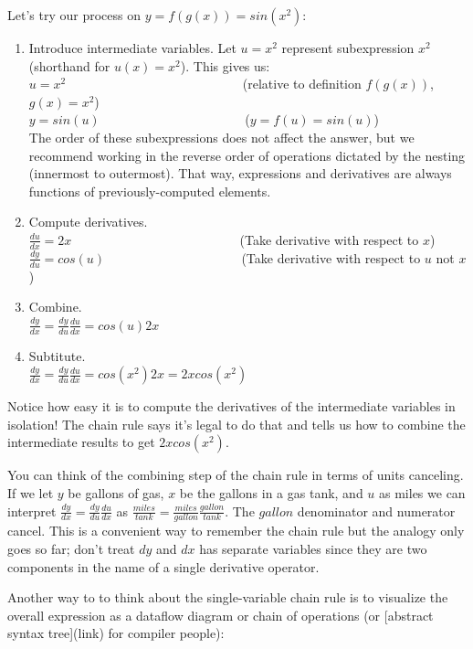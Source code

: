 \documentclass[11pt]{article}
\begin{document}
Let's try our process on $y = f(g(x)) = sin(x^2)$:

\begin{enumerate}
	\item Introduce intermediate variables. Let $u = x^2$ represent subexpression $x^2$ (shorthand for $u(x) = x^2$). This gives us:\\
	$u = x^2$ ~~~~~~~~~~~~~~~~~~~~~~~~~~~(relative to definition $f(g(x))$, $g(x) = x^2$)\\
	$y = sin(u)$ ~~~~~~~~~~~~~~~~~~~~~~($y = f(u) = sin(u)$)\\
The order of these subexpressions does not affect the answer, but we recommend working in the reverse order of operations dictated by the nesting (innermost to outermost). That way, expressions and derivatives are always functions of previously-computed elements. 
	\item Compute derivatives.\\
	$\frac{du}{dx} = 2x$ ~~~~~~~~~~~~~~~~~~~~~~~~~ (Take derivative with respect to $x$)\\
	$\frac{dy}{du} = cos(u)$  ~~~~~~~~~~~~~~~~~~~~ (Take derivative with respect to $u$ not $x$)
	\item Combine.\\
	$\frac{dy}{dx} = \frac{dy}{du} \frac{du}{dx} = cos(u)2x$
	\item Subtitute.\\
	$\frac{dy}{dx} = \frac{dy}{du} \frac{du}{dx} = cos(x^2)2x = 2xcos(x^2)$	
\end{enumerate}

Notice how easy it is to compute the derivatives of the intermediate variables in isolation! The chain rule says it's legal to do that and tells us how to combine the intermediate results to get $2xcos(x^2)$. 

You can think of the combining step of the chain rule in terms of units canceling. If we let $y$ be gallons of gas, $x$ be the gallons in a gas tank, and $u$ as miles we can interpret $\frac{dy}{dx} = \frac{dy}{du} \frac{du}{dx}$ as $\frac{miles}{tank} = \frac{miles}{gallon} \frac{gallon}{tank}$. The $gallon$ denominator and numerator cancel. This is a convenient way to remember the chain rule but the analogy only goes so far; don't treat $dy$ and $dx$ has separate variables since they are two components in the name of a single derivative operator.

Another way to to think about the single-variable chain rule is to visualize the overall expression as a dataflow diagram or chain of operations (or [abstract syntax tree](link) for compiler people):
\end{document}
